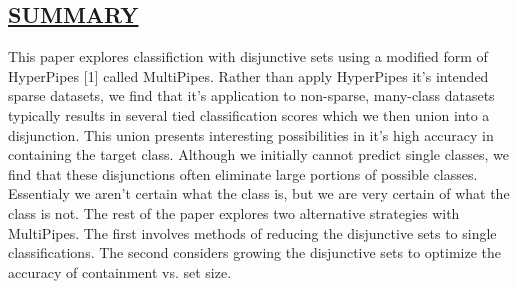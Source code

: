 \begin{kasten}
    \section*{ \hspace{0.1cm} {\color{red} \underline{SUMMARY}}}
    \Large{

\hspace{6mm}This paper explores classifiction with disjunctive sets using a modified form of HyperPipes [1] called MultiPipes. Rather than apply HyperPipes it's intended sparse datasets, we find that it's application to non-sparse, many-class datasets typically results in several tied classification scores which we then union into a disjunction. This union presents interesting possibilities in it's high accuracy in containing the target class. Although we initially cannot predict single classes, we find that these disjunctions often eliminate large portions of possible classes. Essentialy we aren't certain what the class is, but we are very certain of what the class is not. The rest of the paper explores two alternative strategies with MultiPipes. The first involves methods of reducing the disjunctive sets to single classifications. The second considers growing the disjunctive sets to optimize the accuracy of containment vs. set size.
    }
\end{kasten}

